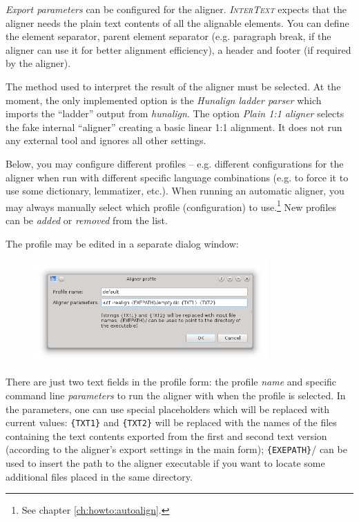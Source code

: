 \documentclass[a4paper,10pt,oneside]{book}
\newcommand{\IT}{\textit{\textsc{InterText}}\xspace}
\begin{document}
\emph{Export parameters} can be configured for the aligner. \IT expects that the aligner needs the plain text contents of all the alignable elements. You can define the element separator, parent element separator (e.g. paragraph break, if the aligner can use it for better alignment efficiency), a header and footer (if required by the aligner).

The method used to interpret the result of the aligner must be selected. At the moment, the only implemented option is the \emph{Hunalign ladder parser} which imports the ``ladder'' output from \emph{hunalign}. The option \emph{Plain 1:1 aligner} selects the fake internal ``aligner'' creating a basic linear 1:1 alignment. It does not run any external tool and ignores all other settings.

Below, you may configure different profiles -- e.g. different configurations for the aligner when run with different specific language combinations (e.g. to force it to use some dictionary, lemmatizer, etc.). When running an automatic aligner, you may always manually select which profile (configuration) to use.\footnote{See chapter \ref{ch:howto:autoalign}.} New profiles can be \emph{added} or \emph{removed} from the list.

The profile may be edited in a separate dialog window:

\begin{figure}[htbf]
 \includegraphics[width=0.8\textwidth]{screenshots/settings_aligner_profile.png}
\end{figure}

There are just two text fields in the profile form: the profile \emph{name} and specific command line \emph{parameters} to run the aligner with when the profile is selected. In the parameters, one can use special placeholders which will be replaced with current values: \texttt{\{TXT1\}} and \texttt{\{TXT2\}} will be replaced with the names of the files containing the text contents exported from the first and second text version (according to the aligner's export settings in the main form); \texttt{\{EXEPATH\}}/ can be used to insert the path to the aligner executable if you want to locate some additional files placed in the same directory.
\end{document}
